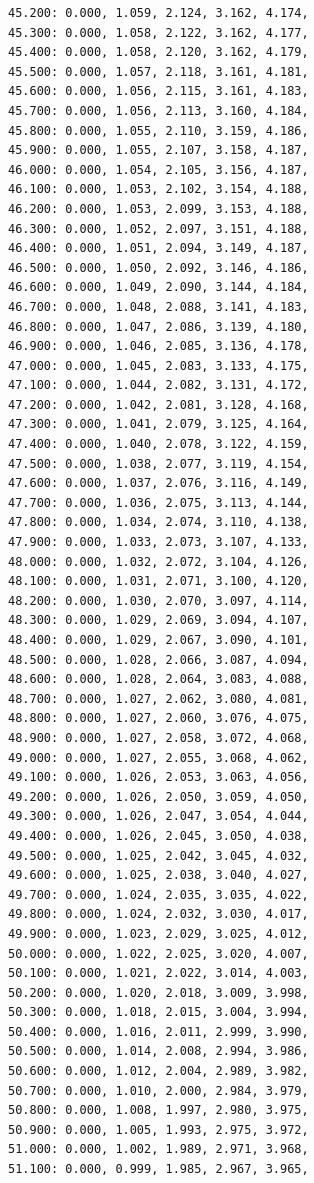 \documentclass[12pt, a4paper]{article}
\begin{document}
\begin{scriptsize}
\begin{ttfamily}
\begin{lstlisting}
45.200: 0.000, 1.059, 2.124, 3.162, 4.174, 
45.300: 0.000, 1.058, 2.122, 3.162, 4.177, 
45.400: 0.000, 1.058, 2.120, 3.162, 4.179, 
45.500: 0.000, 1.057, 2.118, 3.161, 4.181, 
45.600: 0.000, 1.056, 2.115, 3.161, 4.183, 
45.700: 0.000, 1.056, 2.113, 3.160, 4.184, 
45.800: 0.000, 1.055, 2.110, 3.159, 4.186, 
45.900: 0.000, 1.055, 2.107, 3.158, 4.187, 
46.000: 0.000, 1.054, 2.105, 3.156, 4.187, 
46.100: 0.000, 1.053, 2.102, 3.154, 4.188, 
46.200: 0.000, 1.053, 2.099, 3.153, 4.188, 
46.300: 0.000, 1.052, 2.097, 3.151, 4.188, 
46.400: 0.000, 1.051, 2.094, 3.149, 4.187, 
46.500: 0.000, 1.050, 2.092, 3.146, 4.186, 
46.600: 0.000, 1.049, 2.090, 3.144, 4.184, 
46.700: 0.000, 1.048, 2.088, 3.141, 4.183, 
46.800: 0.000, 1.047, 2.086, 3.139, 4.180, 
46.900: 0.000, 1.046, 2.085, 3.136, 4.178, 
47.000: 0.000, 1.045, 2.083, 3.133, 4.175, 
47.100: 0.000, 1.044, 2.082, 3.131, 4.172, 
47.200: 0.000, 1.042, 2.081, 3.128, 4.168, 
47.300: 0.000, 1.041, 2.079, 3.125, 4.164, 
47.400: 0.000, 1.040, 2.078, 3.122, 4.159, 
47.500: 0.000, 1.038, 2.077, 3.119, 4.154, 
47.600: 0.000, 1.037, 2.076, 3.116, 4.149, 
47.700: 0.000, 1.036, 2.075, 3.113, 4.144, 
47.800: 0.000, 1.034, 2.074, 3.110, 4.138, 
47.900: 0.000, 1.033, 2.073, 3.107, 4.133, 
48.000: 0.000, 1.032, 2.072, 3.104, 4.126, 
48.100: 0.000, 1.031, 2.071, 3.100, 4.120, 
48.200: 0.000, 1.030, 2.070, 3.097, 4.114, 
48.300: 0.000, 1.029, 2.069, 3.094, 4.107, 
48.400: 0.000, 1.029, 2.067, 3.090, 4.101, 
48.500: 0.000, 1.028, 2.066, 3.087, 4.094, 
48.600: 0.000, 1.028, 2.064, 3.083, 4.088, 
48.700: 0.000, 1.027, 2.062, 3.080, 4.081, 
48.800: 0.000, 1.027, 2.060, 3.076, 4.075, 
48.900: 0.000, 1.027, 2.058, 3.072, 4.068, 
49.000: 0.000, 1.027, 2.055, 3.068, 4.062, 
49.100: 0.000, 1.026, 2.053, 3.063, 4.056, 
49.200: 0.000, 1.026, 2.050, 3.059, 4.050, 
49.300: 0.000, 1.026, 2.047, 3.054, 4.044, 
49.400: 0.000, 1.026, 2.045, 3.050, 4.038, 
49.500: 0.000, 1.025, 2.042, 3.045, 4.032, 
49.600: 0.000, 1.025, 2.038, 3.040, 4.027, 
49.700: 0.000, 1.024, 2.035, 3.035, 4.022, 
49.800: 0.000, 1.024, 2.032, 3.030, 4.017, 
49.900: 0.000, 1.023, 2.029, 3.025, 4.012, 
50.000: 0.000, 1.022, 2.025, 3.020, 4.007, 
50.100: 0.000, 1.021, 2.022, 3.014, 4.003, 
50.200: 0.000, 1.020, 2.018, 3.009, 3.998, 
50.300: 0.000, 1.018, 2.015, 3.004, 3.994, 
50.400: 0.000, 1.016, 2.011, 2.999, 3.990, 
50.500: 0.000, 1.014, 2.008, 2.994, 3.986, 
50.600: 0.000, 1.012, 2.004, 2.989, 3.982, 
50.700: 0.000, 1.010, 2.000, 2.984, 3.979, 
50.800: 0.000, 1.008, 1.997, 2.980, 3.975, 
50.900: 0.000, 1.005, 1.993, 2.975, 3.972, 
51.000: 0.000, 1.002, 1.989, 2.971, 3.968, 
51.100: 0.000, 0.999, 1.985, 2.967, 3.965, 

\end{lstlisting}
\end{ttfamily}
\end{scriptsize}
\end{document}
